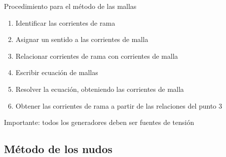 \documentclass[aspectratio=169, xcolor={usenames,svgnames,dvipsnames}]{beamer}
\begin{document}

\begin{frame}{Procedimiento para el método de las mallas}
    \begin{enumerate}
    \item Identificar las corrientes de rama
    \vspace{1mm}
    \item Asignar un sentido a las corrientes de malla
    \vspace{1mm}
    \item Relacionar corrientes de rama con corrientes de malla
    \vspace{1mm}
    \item Escribir ecuación de mallas
    \vspace{1mm}
    \item Resolver la ecuación, obteniendo las corrientes de malla
    \vspace{1mm}
    \item Obtener las corrientes de rama a partir de las relaciones del punto 3
    \end{enumerate}

    \vspace{5mm}
    
    \hspace{7mm} \alert{Importante}: todos los generadores deben ser fuentes de tensión
\end{frame}

    




\subsection{Método de los nudos}
\end{document}
